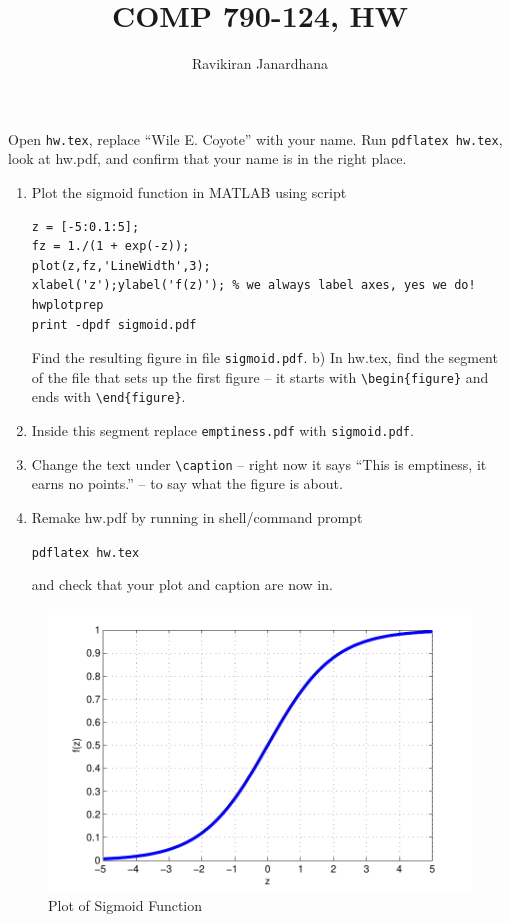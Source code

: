 \documentclass{article}
\begin{document}
\author{Ravikiran Janardhana}
\title{COMP  790-124, HW\theHW}
\maketitle



\newproblem{0.01pt} Open \texttt{hw\theHW.tex}, replace ``Wile E. Coyote'' with your name. Run
\texttt{pdflatex hw\theHW.tex}, look at hw\theHW.pdf, and confirm that your name is in the right place.


\newproblem{1pt}
\begin{enumerate}
\item Plot the sigmoid function in MATLAB using script
\begin{verbatim}
z = [-5:0.1:5];
fz = 1./(1 + exp(-z));
plot(z,fz,'LineWidth',3);
xlabel('z');ylabel('f(z)'); % we always label axes, yes we do!
hwplotprep
print -dpdf sigmoid.pdf
\end{verbatim}
Find the resulting figure in file {\tt sigmoid.pdf}.
b) In hw\theHW.tex, find the segment of the file that sets up the first figure -- it starts with {\tt \textbackslash begin\{figure\}} and ends with  {\tt \textbackslash end\{figure\}}.
\item Inside this segment  replace {\tt emptiness.pdf} with {\tt sigmoid.pdf}.
\item Change the text under {\tt \textbackslash caption} -- right now it says ``This is emptiness, it earns no points.'' -- to say what the figure is about.
\item Remake hw\theHW.pdf by running in shell/command prompt

     \texttt{pdflatex hw\theHW.tex}

and check that your plot and caption are now in.
\end{enumerate}


\begin{figure}[H]
\begin{center}
\includegraphics[scale=0.5]{sigmoid.pdf}
\caption{Plot of Sigmoid Function}
\end{center}
\end{figure}
\end{document}
